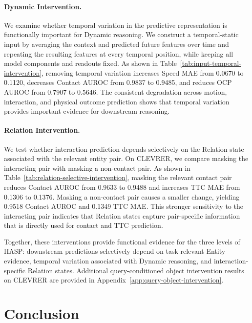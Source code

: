 \documentclass{article}
\begin{document}
\paragraph{Dynamic Intervention.}



We examine whether temporal variation in the predictive representation is functionally important for Dynamic reasoning. We construct a temporal-static input by averaging the context and predicted future features over time and repeating the resulting features at every temporal position, while keeping all model components and readouts fixed.
As shown in Table~\ref{tab:input-temporal-intervention}, removing temporal variation increases Speed MAE from 0.0670 to 0.1120, decreases Contact AUROC from 0.9837 to 0.9485, and reduces OCP AUROC from 0.7907 to 0.5646. The consistent degradation across motion, interaction, and physical outcome prediction shows that temporal variation provides important evidence for downstream reasoning.

\paragraph{Relation Intervention.}



We test whether interaction prediction depends selectively on the Relation state associated with the relevant entity pair. On CLEVRER, we compare masking the interacting pair with masking a non-contact pair.
As shown in Table~\ref{tab:relation-selective-intervention}, masking the relevant contact pair reduces Contact AUROC from 0.9633 to 0.9488 and increases TTC MAE from 0.1306 to 0.1376. Masking a non-contact pair causes a smaller change, yielding 0.9518 Contact AUROC and 0.1349 TTC MAE. This stronger sensitivity to the interacting pair indicates that Relation states capture pair-specific information that is directly used for contact and TTC prediction.

Together, these interventions provide functional evidence for the three levels of HASP: downstream predictions selectively depend on task-relevant Entity evidence, temporal variation associated with Dynamic reasoning, and interaction-specific Relation states. Additional query-conditioned object intervention results on CLEVRER are provided in Appendix~\ref{app:query-object-intervention}.

\section{Conclusion}
\end{document}
